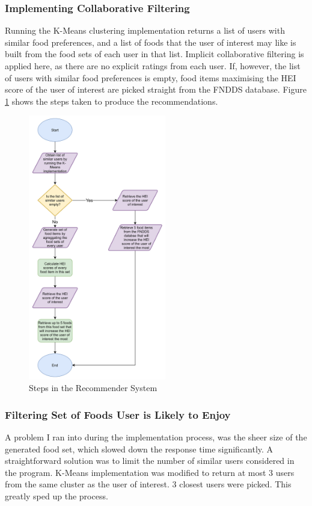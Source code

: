 \documentclass{article}
\begin{document}
\subsubsection{Implementing Collaborative Filtering}
Running the K-Means clustering implementation returns a list of users with similar food preferences, and a list of foods that the user of interest may like is built from the food sets of each user in that list. Implicit collaborative filtering is applied here, as there are no explicit ratings from each user. If, however, the list of users with similar food preferences is empty, food items maximising the HEI score of the user of interest are picked straight from the FNDDS database. Figure \ref{fig:collaborative_filtering} shows the steps taken to produce the recommendations.

\begin{figure}[h]
    \centering
    \includegraphics[width = 6cm]{collaborative_filtering.png}
    \caption{Steps in the Recommender System}
    \label{fig:collaborative_filtering}
\end{figure}

\subsubsection{Filtering Set of Foods User is Likely to Enjoy}
A problem I ran into during the implementation process, was the sheer size of the generated food set, which slowed down the response time significantly. A straightforward solution was to limit the number of similar users considered in the program. K-Means implementation was modified to return at most 3 users from the same cluster as the user of interest. 3 closest users were picked. This greatly sped up the process. 
\end{document}
